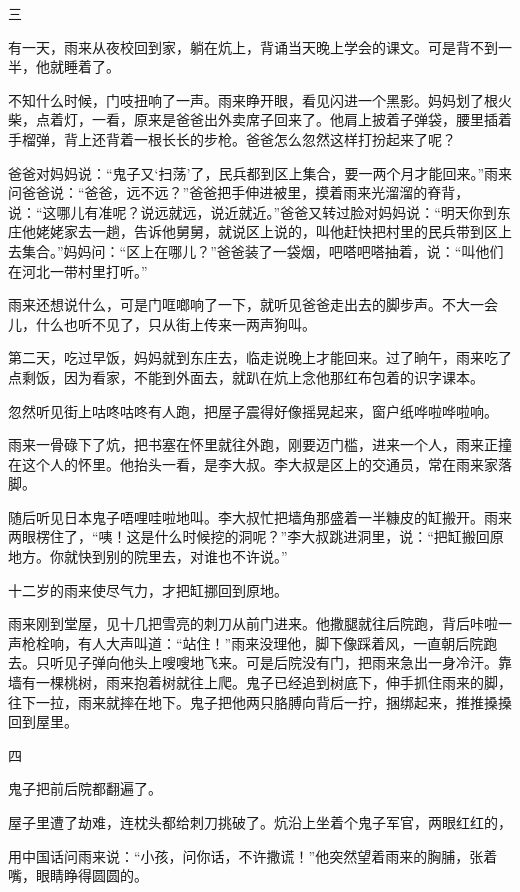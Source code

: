 \documentclass[12pt,UTF-8,openany]{ctexbook}
\begin{document}
\begin{large}
    三
    
    有一天，雨来从夜校回到家，躺在炕上，背诵当天晚上学会的课文。可是背不到一半，他就睡着了。
    
    不知什么时候，门吱扭响了一声。雨来睁开眼，看见闪进一个黑影。妈妈划了根火柴，点着灯，一看，原来是爸爸出外卖席子回来了。他肩上披着子弹袋，腰里插着手榴弹，背上还背着一根长长的步枪。爸爸怎么忽然这样打扮起来了呢？
    
    爸爸对妈妈说：“鬼子又‘扫荡’了，民兵都到区上集合，要一两个月才能回来。”雨来问爸爸说：“爸爸，远不远？”爸爸把手伸进被里，摸着雨来光溜溜的脊背，说：“这哪儿有准呢？说远就远，说近就近。”爸爸又转过脸对妈妈说：“明天你到东庄他姥姥家去一趟，告诉他舅舅，就说区上说的，叫他赶快把村里的民兵带到区上去集合。”妈妈问：“区上在哪儿？”爸爸装了一袋烟，吧嗒吧嗒抽着，说：“叫他们在河北一带村里打听。”
    
    雨来还想说什么，可是门哐啷响了一下，就听见爸爸走出去的脚步声。不大一会儿，什么也听不见了，只从街上传来一两声狗叫。
    
    第二天，吃过早饭，妈妈就到东庄去，临走说晚上才能回来。过了晌午，雨来吃了点剩饭，因为看家，不能到外面去，就趴在炕上念他那红布包着的识字课本。
    
    忽然听见街上咕咚咕咚有人跑，把屋子震得好像摇晃起来，窗户纸哗啦哗啦响。
    
    雨来一骨碌下了炕，把书塞在怀里就往外跑，刚要迈门槛，进来一个人，雨来正撞在这个人的怀里。他抬头一看，是李大叔。李大叔是区上的交通员，常在雨来家落脚。
    
    随后听见日本鬼子唔哩哇啦地叫。李大叔忙把墙角那盛着一半糠皮的缸搬开。雨来两眼楞住了，“咦！这是什么时候挖的洞呢？”李大叔跳进洞里，说：“把缸搬回原地方。你就快到别的院里去，对谁也不许说。”
    
    十二岁的雨来使尽气力，才把缸挪回到原地。
    
    雨来刚到堂屋，见十几把雪亮的刺刀从前门进来。他撒腿就往后院跑，背后咔啦一声枪栓响，有人大声叫道：“站住！”雨来没理他，脚下像踩着风，一直朝后院跑去。只听见子弹向他头上嗖嗖地飞来。可是后院没有门，把雨来急出一身冷汗。靠墙有一棵桃树，雨来抱着树就往上爬。鬼子已经追到树底下，伸手抓住雨来的脚，往下一拉，雨来就摔在地下。鬼子把他两只胳膊向背后一拧，捆绑起来，推推搡搡回到屋里。
    
    四
    
    鬼子把前后院都翻遍了。
    
    屋子里遭了劫难，连枕头都给刺刀挑破了。炕沿上坐着个鬼子军官，两眼红红的，
    
    用中国话问雨来说：“小孩，问你话，不许撒谎！”他突然望着雨来的胸脯，张着嘴，眼睛睁得圆圆的。
    

\end{large}
\end{document}
